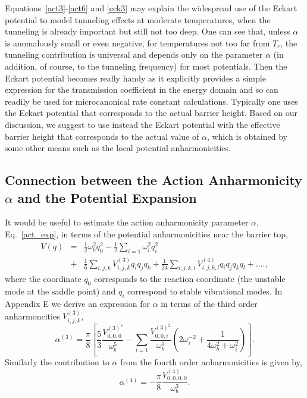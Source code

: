 \documentclass[journal=jpcafh,manuscript=article]{achemso}
\begin{document}
Equations~\ref{act3}-\ref{act6} and \ref{eck3} may explain the
widespread use of the Eckart potential to model tunneling effects
at moderate temperatures, when the tunneling is already important but
still not too deep. One can see that, unless $\alpha$ is anomalously
small or even negative, for temperatures not too far from $T_c$, the
tunneling contribution is universal and depends only on the parameter
$\alpha$ (in addition, of course, to the tunneling frequency) for most
potentials. Then the Eckart potential becomes really handy as
it explicitly provides a simple expression for the transmission
coefficient in the energy domain and so can readily be used for
microcanonical rate constant calculations. Typically one uses the
Eckart potential that corresponds to the actual barrier height. Based
on our discussion, we suggest to use instead the Eckart potential with
the effective barrier height that corresponds to the actual value of
$\alpha$, which is obtained by some other means such as the local
potential anharmonicities.

\subsection{Connection between the Action Anharmonicity $\alpha$ and
  the Potential Expansion}

It would be useful to estimate the action anharmonicity parameter
$\alpha$, Eq.~\ref{act_exp}, in terms of the potential
anharmonicities near the barrier top,
\begin{eqnarray}
  \label{multi_pot_exp}
  V(q)&=&\frac{1}{2}\omega_b^2q_0^2-\frac{1}{2}\sum_{i=1}\omega_i^2q_i^2
  \\
  \nonumber
  &+&\frac{1}{6}\sum_{i,j,k}V^{(3)}_{i,j,k}q_iq_jq_k+\frac{1}{24}\sum_{i,j,k,l}V^{(4)}_{i,j,k,l}q_iq_jq_kq_l+....,
\end{eqnarray}
where the coordinate $q_0$ corresponds to the reaction coordinate (the
unstable mode at the saddle point) and $q_i$ correspond to stable
vibrational modes.  In Appendix E we derive an expression for
$\alpha$ in terms of the third order anharmoncities $V^{(3)}_{i,j,k}$,
\begin{equation}
  \label{alpha_m3}
  \alpha^{(3)}=\frac{\pi}{8}\left[\frac{5}{3}\frac{V_{0,0,0}^{(3)^2}}{\omega_b^5}
    -\sum_{i=1}\frac{V_{0,0,i}^{(3)^2}}{\omega_b^3}\left(2\omega_i^{-2}+\frac{1}{4\omega_b^2+\omega_i^2}\right)\right].
\end{equation}
Similarly the contribution to $\alpha$ from the fourth order
anharmonicities is given by,
\begin{equation}
  \label{alpha_m4}
  \alpha^{(4)}=-\frac{\pi}{8}\frac{V_{0,0,0,0}^{(4)}}{\omega_b^3}.
\end{equation}
\end{document}
